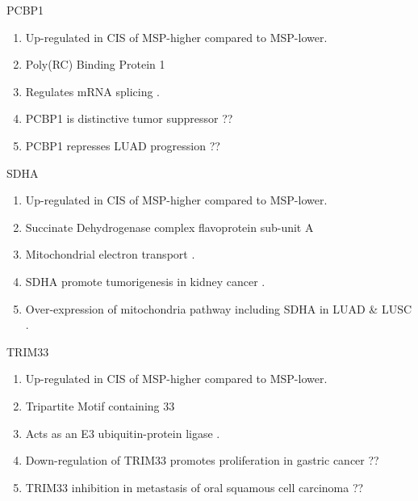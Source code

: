 \documentclass{beamer}
\begin{document}
\begin{frame}[allowframebreaks]
         \begin{block}{PCBP1}
            \begin{enumerate}
                \item Up-regulated in CIS of MSP-higher compared to MSP-lower.
                \item Poly(RC) Binding Protein 1
                \item Regulates mRNA splicing \cite{PCBP1-1}.
                \item PCBP1 is distinctive tumor suppressor \cite{PCBP1-2} ??
                \item PCBP1 represses LUAD progression \cite{PCBP1-3} ??
            \end{enumerate}
        \end{block}

         \begin{block}{SDHA}
            \begin{enumerate}
                \item Up-regulated in CIS of MSP-higher compared to MSP-lower.
                \item Succinate Dehydrogenase complex flavoprotein sub-unit A
                \item Mitochondrial electron transport \cite{SDHA-1}.
                \item SDHA promote tumorigenesis in kidney cancer \cite{SDHA-2}.
                \item Over-expression of mitochondria pathway including SDHA in LUAD \& LUSC \cite{SDHA-3}.
            \end{enumerate}
        \end{block}

         \begin{block}{TRIM33}
            \begin{enumerate}
                \item Up-regulated in CIS of MSP-higher compared to MSP-lower.
                \item Tripartite Motif containing 33
                \item Acts as an E3 ubiquitin-protein ligase \cite{TRIM33-1}.
                \item Down-regulation of TRIM33 promotes proliferation in gastric cancer \cite{TRIM33-2} ??
                \item TRIM33 inhibition in metastasis of oral squamous cell carcinoma \cite{TRIM33-3} ??
            \end{enumerate}
        \end{block}


\end{frame}
\end{document}
